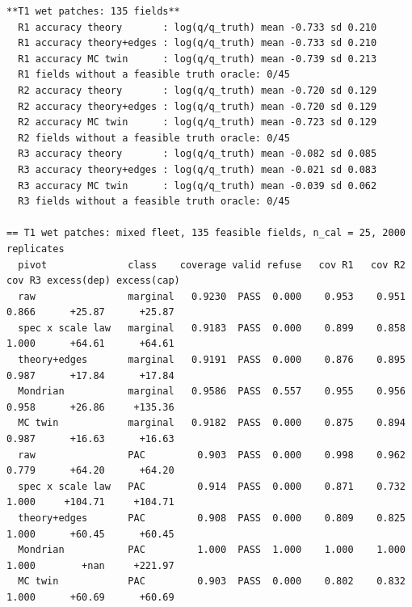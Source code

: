 \documentclass[preprint,12pt,authoryear]{elsarticle}
\begin{document}
\begin{Verbatim}[fontsize=\tiny,breaklines]
**T1 wet patches: 135 fields**
  R1 accuracy theory       : log(q/q_truth) mean -0.733 sd 0.210
  R1 accuracy theory+edges : log(q/q_truth) mean -0.733 sd 0.210
  R1 accuracy MC twin      : log(q/q_truth) mean -0.739 sd 0.213
  R1 fields without a feasible truth oracle: 0/45
  R2 accuracy theory       : log(q/q_truth) mean -0.720 sd 0.129
  R2 accuracy theory+edges : log(q/q_truth) mean -0.720 sd 0.129
  R2 accuracy MC twin      : log(q/q_truth) mean -0.723 sd 0.129
  R2 fields without a feasible truth oracle: 0/45
  R3 accuracy theory       : log(q/q_truth) mean -0.082 sd 0.085
  R3 accuracy theory+edges : log(q/q_truth) mean -0.021 sd 0.083
  R3 accuracy MC twin      : log(q/q_truth) mean -0.039 sd 0.062
  R3 fields without a feasible truth oracle: 0/45

== T1 wet patches: mixed fleet, 135 feasible fields, n_cal = 25, 2000 replicates
  pivot              class    coverage valid refuse   cov R1   cov R2   cov R3 excess(dep) excess(cap)
  raw                marginal   0.9230  PASS  0.000    0.953    0.951    0.866      +25.87      +25.87
  spec x scale law   marginal   0.9183  PASS  0.000    0.899    0.858    1.000      +64.61      +64.61
  theory+edges       marginal   0.9191  PASS  0.000    0.876    0.895    0.987      +17.84      +17.84
  Mondrian           marginal   0.9586  PASS  0.557    0.955    0.956    0.958      +26.86     +135.36
  MC twin            marginal   0.9182  PASS  0.000    0.875    0.894    0.987      +16.63      +16.63
  raw                PAC         0.903  PASS  0.000    0.998    0.962    0.779      +64.20      +64.20
  spec x scale law   PAC         0.914  PASS  0.000    0.871    0.732    1.000     +104.71     +104.71
  theory+edges       PAC         0.908  PASS  0.000    0.809    0.825    1.000      +60.45      +60.45
  Mondrian           PAC         1.000  PASS  1.000    1.000    1.000    1.000        +nan     +221.97
  MC twin            PAC         0.903  PASS  0.000    0.802    0.832    1.000      +60.69      +60.69


\end{Verbatim}
\end{document}
